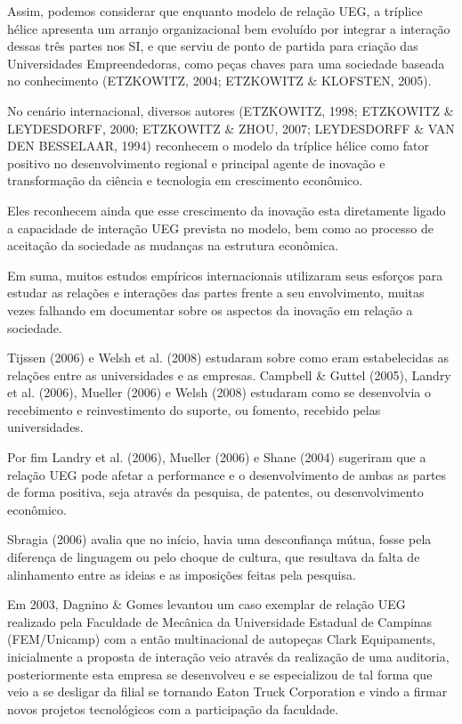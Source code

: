 Assim, podemos considerar que enquanto modelo de relação UEG, a tríplice hélice apresenta um arranjo organizacional bem evoluído por integrar a interação dessas três partes nos SI, e que serviu de ponto de partida para criação das Universidades Empreendedoras, como peças chaves para uma sociedade baseada no conhecimento (ETZKOWITZ, 2004; ETZKOWITZ \& KLOFSTEN, 2005).

No cenário internacional, diversos autores (ETZKOWITZ, 1998; ETZKOWITZ \& LEYDESDORFF, 2000; ETZKOWITZ \& ZHOU, 2007; LEYDESDORFF \& VAN DEN BESSELAAR, 1994) reconhecem o modelo da tríplice hélice como fator positivo no desenvolvimento regional e principal agente de inovação e transformação da ciência e tecnologia em crescimento econômico.

Eles reconhecem ainda que esse crescimento da inovação esta diretamente ligado a capacidade de interação UEG prevista no modelo, bem como ao processo de aceitação da sociedade as mudanças na estrutura econômica.

Em suma, muitos estudos empíricos internacionais utilizaram seus esforços para estudar as relações e interações das partes frente a seu envolvimento, muitas vezes falhando em documentar sobre os aspectos da inovação em relação a sociedade.

Tijssen (2006) e Welsh et al. (2008) estudaram sobre como eram estabelecidas as relações entre as universidades e as empresas. Campbell \& Guttel (2005), Landry et al. (2006), Mueller (2006) e Welsh (2008) estudaram como se desenvolvia o recebimento e reinvestimento do suporte, ou fomento, recebido pelas universidades.

Por fim Landry et al. (2006), Mueller (2006) e Shane (2004) sugeriram que a relação UEG pode afetar a performance e o desenvolvimento de ambas as partes de forma positiva, seja através da pesquisa, de patentes, ou desenvolvimento econômico.

Sbragia (2006) avalia que no início, havia uma desconfiança mútua, fosse pela diferença de linguagem ou pelo choque de cultura, que resultava da falta de alinhamento entre as ideias e as imposições feitas pela pesquisa.

Em 2003, Dagnino \& Gomes levantou um caso exemplar de relação UEG realizado pela Faculdade de Mecânica da Universidade Estadual de Campinas (FEM/Unicamp) com a então multinacional de autopeças Clark Equipaments, inicialmente a proposta de interação veio através da realização de uma auditoria, posteriormente esta empresa se desenvolveu e se especializou de tal forma que veio a se desligar da filial se tornando Eaton Truck Corporation e vindo a firmar novos projetos tecnológicos com a participação da faculdade.

